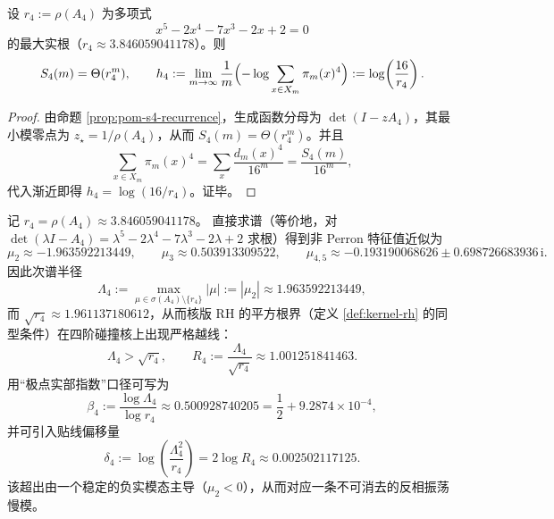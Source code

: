 \begin{corollary}\label{cor:pom-s4-asymptotic}
设 \(r_4:=\rho(A_4)\) 为多项式
$$
x^5-2x^4-7x^3-2x+2=0
$$
的最大实根（\(r_4\approx 3.846059041178\)）。则
$$
S_4(m)=\Theta(r_4^m),
\qquad
h_4:=\lim_{m\to\infty}\frac{1}{m}\Bigl(-\log\sum_{x\in X_m}\pi_m(x)^4\Bigr)
:=\log\!\left(\frac{16}{r_4}\right).
$$
\end{corollary}
\begin{proof}
由命题 \ref{prop:pom-s4-recurrence}，生成函数分母为 \(\det(I-zA_4)\)，其最小模零点为 \(z_\star=1/\rho(A_4)\)，从而 \(S_4(m)=\Theta(r_4^m)\)。并且
$$
\sum_{x\in X_m}\pi_m(x)^4=\sum_x\frac{d_m(x)^4}{16^m}=\frac{S_4(m)}{16^m},
$$
代入渐近即得 \(h_4=\log(16/r_4)\)。证毕。
\end{proof}


\begin{remark}\label{rem:pom-collision-rh-break-a4-spectrum}
记 \(r_4=\rho(A_4)\approx 3.846059041178\)。
直接求谱（等价地，对 \(\det(\lambda I-A_4)=\lambda^5-2\lambda^4-7\lambda^3-2\lambda+2\) 求根）得到非 Perron 特征值近似为
\[
\mu_2\approx -1.963592213449,\qquad
\mu_3\approx 0.503913309522,\qquad
\mu_{4,5}\approx -0.193190068626\pm 0.698726683936\,\mathrm{i}.
\]
因此次谱半径
\[
\Lambda_4:=\max_{\mu\in\sigma(A_4)\setminus\{r_4\}}|\mu|
:=|\mu_2|
\approx 1.963592213449,
\]
而
\(
\sqrt{r_4}\approx 1.961137180612
\)，从而核版 RH 的平方根界（定义 \ref{def:kernel-rh} 的同型条件）在四阶碰撞核上出现严格越线：
\[
\Lambda_4>\sqrt{r_4},\qquad
R_4:=\frac{\Lambda_4}{\sqrt{r_4}}\approx 1.001251841463.
\]
用“极点实部指数”口径可写为
\[
\beta_4:=\frac{\log \Lambda_4}{\log r_4}\approx 0.500928740205=\frac12+9.2874\times 10^{-4},
\]
并可引入贴线偏移量
\[
\delta_4:=\log\!\left(\frac{\Lambda_4^2}{r_4}\right)=2\log R_4\approx 0.002502117125.
\]
 该超出由一个稳定的负实模态主导（\(\mu_2<0\)），从而对应一条不可消去的反相振荡慢模。
\end{remark}

